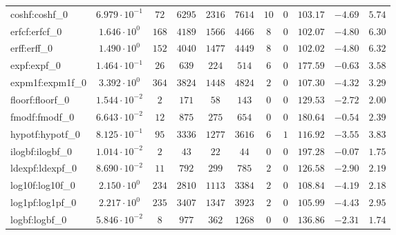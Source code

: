 \begin{tabular}{|l|c|c|c|c|c|c|c|c|c|c|}
coshf:coshf\_0               & $ 6.979 \cdot 10^{-1} $ & $ 72     $ & $ 6295   $ & $ 2316  $ & $ 7614   $ & $ 10  $ & $ 0 $ & $ 103.17      $ & $ -4.69   $ & $ 5.74    $ \\
erfcf:erfcf\_0               & $ 1.646 \cdot 10^{0}  $ & $ 168    $ & $ 4189   $ & $ 1566  $ & $ 4466   $ & $ 8   $ & $ 0 $ & $ 102.07      $ & $ -4.80   $ & $ 6.30    $ \\
erff:erff\_0                 & $ 1.490 \cdot 10^{0}  $ & $ 152    $ & $ 4040   $ & $ 1477  $ & $ 4449   $ & $ 8   $ & $ 0 $ & $ 102.02      $ & $ -4.80   $ & $ 6.32    $ \\
expf:expf\_0                 & $ 1.464 \cdot 10^{-1} $ & $ 26     $ & $ 639    $ & $ 224   $ & $ 514    $ & $ 6   $ & $ 0 $ & $ 177.59      $ & $ -0.63   $ & $ 3.58    $ \\
expm1f:expm1f\_0             & $ 3.392 \cdot 10^{0}  $ & $ 364    $ & $ 3824   $ & $ 1448  $ & $ 4824   $ & $ 2   $ & $ 0 $ & $ 107.30      $ & $ -4.32   $ & $ 3.29    $ \\
floorf:floorf\_0             & $ 1.544 \cdot 10^{-2} $ & $ 2      $ & $ 171    $ & $ 58    $ & $ 143    $ & $ 0   $ & $ 0 $ & $ 129.53      $ & $ -2.72   $ & $ 2.00    $ \\
fmodf:fmodf\_0               & $ 6.643 \cdot 10^{-2} $ & $ 12     $ & $ 875    $ & $ 275   $ & $ 654    $ & $ 0   $ & $ 0 $ & $ 180.64      $ & $ -0.54   $ & $ 2.39    $ \\
hypotf:hypotf\_0             & $ 8.125 \cdot 10^{-1} $ & $ 95     $ & $ 3336   $ & $ 1277  $ & $ 3616   $ & $ 6   $ & $ 1 $ & $ 116.92      $ & $ -3.55   $ & $ 3.83    $ \\
ilogbf:ilogbf\_0             & $ 1.014 \cdot 10^{-2} $ & $ 2      $ & $ 43     $ & $ 22    $ & $ 44     $ & $ 0   $ & $ 0 $ & $ 197.28      $ & $ -0.07   $ & $ 1.75    $ \\
ldexpf:ldexpf\_0             & $ 8.690 \cdot 10^{-2} $ & $ 11     $ & $ 792    $ & $ 299   $ & $ 785    $ & $ 2   $ & $ 0 $ & $ 126.58      $ & $ -2.90   $ & $ 2.19    $ \\
log10f:log10f\_0             & $ 2.150 \cdot 10^{0}  $ & $ 234    $ & $ 2810   $ & $ 1113  $ & $ 3384   $ & $ 2   $ & $ 0 $ & $ 108.84      $ & $ -4.19   $ & $ 2.18    $ \\
log1pf:log1pf\_0             & $ 2.217 \cdot 10^{0}  $ & $ 235    $ & $ 3407   $ & $ 1347  $ & $ 3923   $ & $ 2   $ & $ 0 $ & $ 105.99      $ & $ -4.43   $ & $ 2.95    $ \\
logbf:logbf\_0               & $ 5.846 \cdot 10^{-2} $ & $ 8      $ & $ 977    $ & $ 362   $ & $ 1268   $ & $ 0   $ & $ 0 $ & $ 136.86      $ & $ -2.31   $ & $ 1.74    $ \\

\end{tabular}
